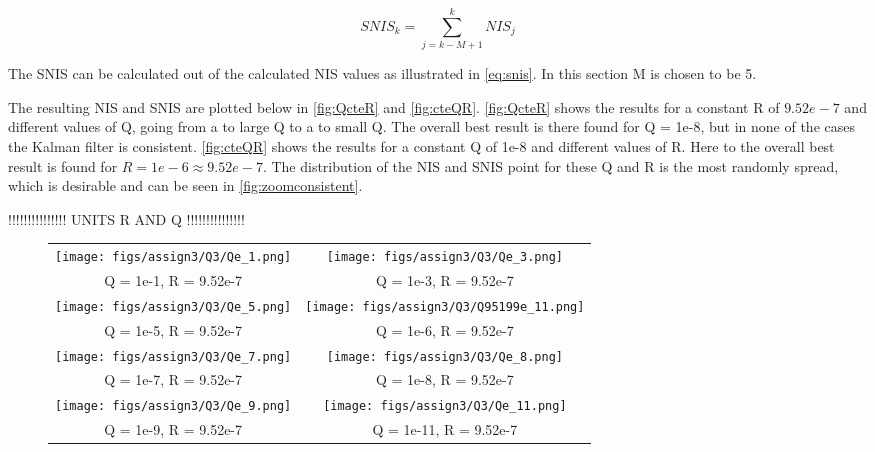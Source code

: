 \documentclass[a4paper]{article}
\newcommand{\newpar}{\vspace{.3cm}\noindent}
\begin{document}
\begin{equation}
    SNIS_{k}=\sum_{j=k-M+1}^{k} NIS_{j}
    \label{eq:snis}
\end{equation}

\newpar
The SNIS can be calculated out of the calculated NIS values as illustrated in \autoref{eq:snis}. In this section M is chosen to be 5.

\newpar
The resulting NIS and SNIS are plotted below in \autoref{fig:QcteR} and \autoref{fig:cteQR}. \autoref{fig:QcteR} shows the results for a constant R of $9.52e-7$ and different values of Q, going from a to large Q to a to small Q. The overall best result is there found for Q = 1e-8, but in none of the cases the Kalman filter is consistent. \autoref{fig:cteQR} shows the results for a constant Q of 1e-8 and different values of R. Here to the overall best result is found for $R = 1e-6 \approx 9.52e-7$. The distribution of the NIS and SNIS point for these Q and R is the most randomly spread, which is desirable and can be seen in \autoref{fig:zoomconsistent}.

\newpar
!!!!!!!!!!!!!!! UNITS R AND Q !!!!!!!!!!!!!!!

\begin{figure}[H]
\begin{adjustwidth}{-3cm}{-3cm}
\centering
\begin{tabular}{cc}
  \texttt{[image: figs/assign3/Q3/Qe\_1.png]} &   \texttt{[image: figs/assign3/Q3/Qe\_3.png]} \\
  Q = 1e-1, R = 9.52e-7 & Q = 1e-3, R = 9.52e-7 \\[8pt]
  \texttt{[image: figs/assign3/Q3/Qe\_5.png]} & \texttt{[image: figs/assign3/Q3/Q95199e\_11.png]} \\
  Q = 1e-5, R = 9.52e-7 & Q = 1e-6, R = 9.52e-7 \\[8pt]
  \texttt{[image: figs/assign3/Q3/Qe\_7.png]} & \texttt{[image: figs/assign3/Q3/Qe\_8.png]} \\
  Q = 1e-7, R = 9.52e-7 & Q = 1e-8, R = 9.52e-7 \\[8pt]
  \texttt{[image: figs/assign3/Q3/Qe\_9.png]} & \texttt{[image: figs/assign3/Q3/Qe\_11.png]}\\
  Q = 1e-9, R = 9.52e-7 & Q = 1e-11, R = 9.52e-7
\end{tabular}
\end{adjustwidth}
\label{fig:QcteR}
\end{figure}
\end{document}
